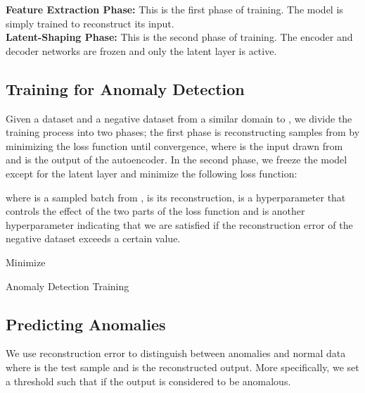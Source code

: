 \documentclass[acmtog, nonacm]{acmart}
\begin{document}
\noindent
\textbf{Feature Extraction Phase:} This is the first phase of training. The model is simply trained to reconstruct its input. \\
\textbf{Latent-Shaping Phase: }This is the second phase of training. The encoder and decoder networks are frozen and only the latent layer is active. 

\subsection{Training for Anomaly Detection}

Given a dataset  and a negative dataset  from a similar domain to , we divide the training process into two phases; the first phase is reconstructing samples from  by minimizing the loss function  until convergence, where  is the input drawn from  and  is the output of the autoencoder. In the second phase, we freeze the model except for the latent layer and minimize the following loss function: 

where   is a sampled batch from  ,  is its reconstruction,  is a hyperparameter that controls the effect of the two parts of the loss function and  is another hyperparameter indicating that we are satisfied if the reconstruction error   of the negative dataset exceeds a certain value.


\begin{algorithm}
\DontPrintSemicolon
\SetAlgoLined
{}
{
    \;
    \;
    Minimize \;
}

\;
\;
\caption{Anomaly Detection Training}
\label{algo:alg1}
\end{algorithm}

\subsection{Predicting Anomalies}


We use reconstruction error  to distinguish between anomalies and normal data where  is the test sample and  is the reconstructed output. More specifically, we set a threshold  such that if  the output is considered to be anomalous.
\end{document}
